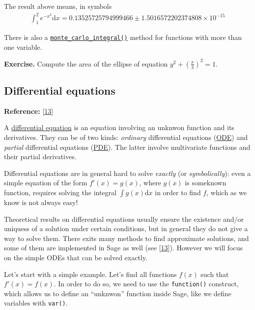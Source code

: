 \documentclass[11pt]{article}
\begin{document}
    The result above means, in symbols \begin{align*}
\int_1^2 e^{-x^2}\mathrm dx = 0.13525725794999466 \pm 1.5016572202374808\times 10^{-15}
\end{align*}

There is also a
\href{https://doc.sagemath.org/html/en/reference/calculus/sage/calculus/integration.html\#sage.calculus.integration.monte_carlo_integral}{\texttt{monte\_carlo\_integral()}}
method for functions with more than one variable.

    \textbf{Exercise.} Compute the area of the ellipse of equation
\(y^2+\left(\frac x3\right)^2=1\).

    \hypertarget{differential-equations}{%
\subsection{Differential equations}\label{differential-equations}}

\textbf{Reference:}
{[}\href{https://doc.sagemath.org/html/en/reference/calculus/sage/calculus/desolvers.html}{13}{]}

A
\href{https://en.wikipedia.org/wiki/Differential_equation}{differential
equation} is an equation involving an unknwon function and its
derivatives. They can be of two kinds: \emph{ordinary} differential
equations
(\href{https://en.wikipedia.org/wiki/Ordinary_differential_equation}{ODE})
and \emph{partial} differential equations
(\href{https://en.wikipedia.org/wiki/Partial_differential_equation}{PDE}).
The latter involve multivariate functions and their partial derivatives.

Differential equations are in general hard to solve \emph{exactly} (or
\emph{symbolically}): even a simple equation of the form \(f'(x)=g(x)\),
where \(g(x)\) is someknown function, requires solving the integral
\(\int g(x)\mathrm{d}x\) in order to find \(f\), which as we know is not
always easy!

Theoretical results on differential equations usually ensure the
existence and/or uniquess of a solution under certain conditions, but in
general they do not give a way to solve them. There exits many methods
to find approximate solutions, and some of them are implemented in Sage
as well (see
{[}\href{https://doc.sagemath.org/html/en/reference/calculus/sage/calculus/desolvers.html}{13}{]}).
However we will focus on the simple ODEs that can be solved exactly.

Let's start with a simple example. Let's find all functions \(f(x)\)
such that \(f'(x)=f(x)\). In order to do so, we need to use the
\texttt{function()} construct, which allows us to define an ``unknwon''
function inside Sage, like we define variables with \texttt{var()}.
\end{document}
